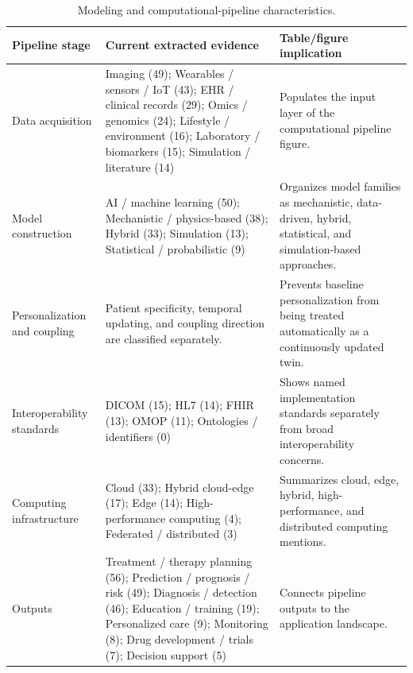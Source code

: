 \begin{table}[htbp]
\centering
\small
\caption{Modeling and computational-pipeline characteristics.}
\label{tab:pipeline}
\begin{tabularx}{\textwidth}{@{}>{\raggedright\arraybackslash}p{}YY@{}}
\toprule
\textbf{Pipeline stage} & \textbf{Current extracted evidence} & \textbf{Table/figure implication} \\
\midrule
Data acquisition & Imaging (49); Wearables / sensors / IoT (43); EHR / clinical records (29); Omics / genomics (24); Lifestyle / environment (16); Laboratory / biomarkers (15); Simulation / literature (14) & Populates the input layer of the computational pipeline figure. \\
Model construction & AI / machine learning (50); Mechanistic / physics-based (38); Hybrid (33); Simulation (13); Statistical / probabilistic (9) & Organizes model families as mechanistic, data-driven, hybrid, statistical, and simulation-based approaches. \\
Personalization and coupling & Patient specificity, temporal updating, and coupling direction are classified separately. & Prevents baseline personalization from being treated automatically as a continuously updated twin. \\
Interoperability standards & DICOM (15); HL7 (14); FHIR (13); OMOP (11); Ontologies / identifiers (0) & Shows named implementation standards separately from broad interoperability concerns. \\
Computing infrastructure & Cloud (33); Hybrid cloud-edge (17); Edge (14); High-performance computing (4); Federated / distributed (3) & Summarizes cloud, edge, hybrid, high-performance, and distributed computing mentions. \\
Outputs & Treatment / therapy planning (56); Prediction / prognosis / risk (49); Diagnosis / detection (46); Education / training (19); Personalized care (9); Monitoring (8); Drug development / trials (7); Decision support (5) & Connects pipeline outputs to the application landscape. \\
\bottomrule
\end{tabularx}
\end{table}
